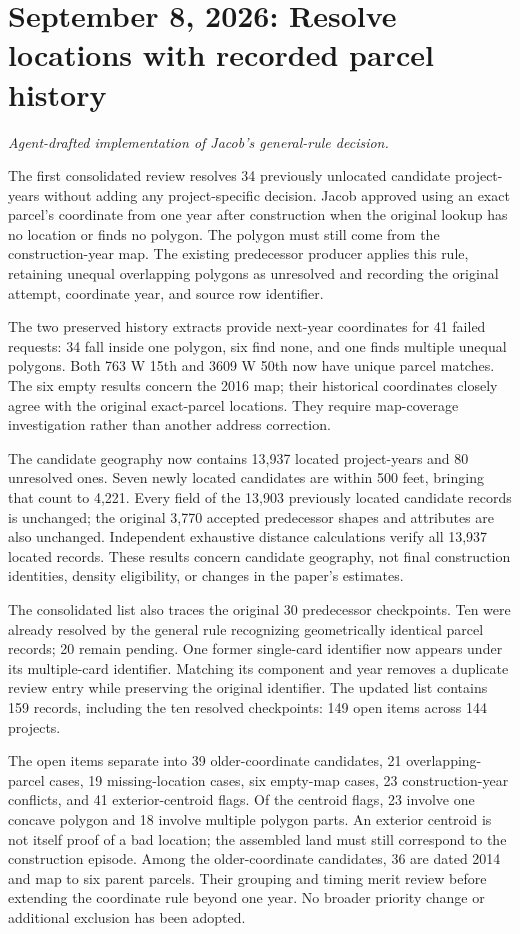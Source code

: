 \section*{September 8, 2026: Resolve locations with recorded parcel history}
\textit{Agent-drafted implementation of Jacob's general-rule decision.}

The first consolidated review resolves 34 previously unlocated candidate
project-years without adding any project-specific decision. Jacob approved
using an exact parcel's coordinate from one year after construction when the
original lookup has no location or finds no polygon. The polygon must still come
from the construction-year map. The existing predecessor producer applies this
rule, retaining unequal overlapping polygons as unresolved and recording the
original attempt, coordinate year, and source row identifier.

The two preserved history extracts provide next-year coordinates for 41 failed
requests: 34 fall inside one polygon, six find none, and one finds multiple
unequal polygons. Both 763 W 15th and 3609 W 50th now have unique parcel
matches. The six empty results concern the 2016 map; their historical coordinates
closely agree with the original exact-parcel locations. They require map-coverage
investigation rather than another address correction.

The candidate geography now contains 13,937 located project-years and 80 unresolved
ones. Seven newly located candidates are within 500 feet, bringing that count to
4,221. Every field of the 13,903 previously located candidate records is unchanged;
the original 3,770 accepted predecessor shapes and attributes are also unchanged.
Independent exhaustive distance calculations verify all 13,937 located records.
These results concern candidate geography, not final construction identities,
density eligibility, or changes in the paper's estimates.

The consolidated list also traces the original 30 predecessor checkpoints. Ten
were already resolved by the general rule recognizing geometrically identical
parcel records; 20 remain pending. One former single-card identifier now appears
under its multiple-card identifier. Matching its component and year removes a
duplicate review entry while preserving the original identifier. The updated list contains 159 records,
including the ten resolved checkpoints: 149 open items across 144 projects.

The open items separate into 39 older-coordinate candidates, 21 overlapping-parcel
cases, 19 missing-location cases, six empty-map cases, 23 construction-year
conflicts, and 41 exterior-centroid flags. Of the centroid flags, 23 involve one
concave polygon and 18 involve multiple polygon parts. An exterior centroid is
not itself proof of a bad location; the assembled land must still correspond to
the construction episode. Among the older-coordinate candidates, 36 are dated
2014 and map to six parent parcels. Their grouping and timing merit review before
extending the coordinate rule beyond one year. No broader priority change or
additional exclusion has been adopted.

